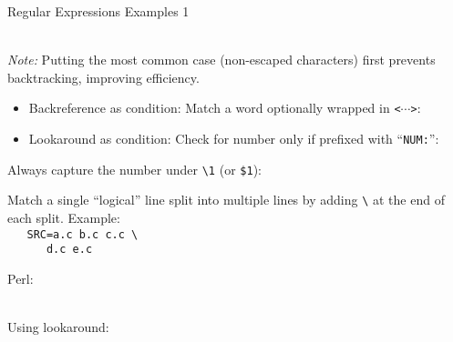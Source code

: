 \documentclass[11pt, a4paper, landscape]{scrartcl}
\newcommand{\regex}[1]{\texttt{#1}}
\newcommand{\code}[1]{\texttt{#1}}
\newcommand{\bs}{\textbackslash}
\begin{document}
\begin{cheatsheet}{Regular Expressions Examples 1}

\begin{col1}


\regex{}\\
\emph{Note:} Putting the most common case (non-escaped characters) first prevents backtracking, improving efficiency.\\


\begin{itemize}
	\item Backreference as condition: Match a word optionally wrapped in \code{<$\cdots$>}:\\
	\regex{}
	\item Lookaround as condition: Check for number only if prefixed with ``\code{NUM:}'':\\
	\regex{}
\end{itemize}


Always capture the number under \regex{\bs{}1} (or \regex{\$1}):\\
\regex{}


Match a single ``logical'' line split into multiple lines by adding \regex{\bs}
at the end of each split. Example:\\
\texttt{%
\mbox{}\ \ SRC=a.c b.c c.c \bs\\
\mbox{}\ \ \ \ \ \ d.c e.c}

\regex{}

\end{col1}

\begin{col2}


Perl:\\
\regex{}\\


Using lookaround:\\
\regex{}\\


\end{col2}
\end{cheatsheet}
\end{document}
